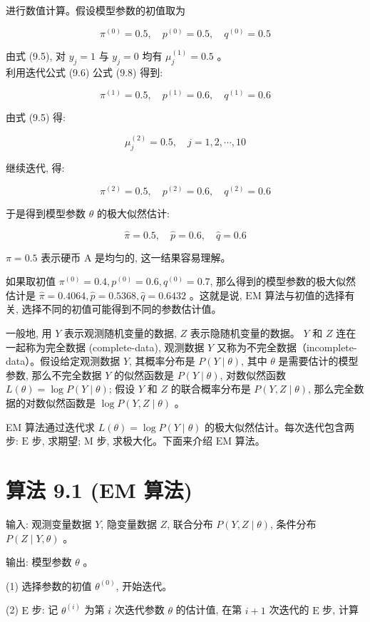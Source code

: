 \documentclass[10pt]{article}
\begin{document}
进行数值计算。假设模型参数的初值取为

$$
\pi^{(0)}=0.5, \quad p^{(0)}=0.5, \quad q^{(0)}=0.5
$$

由式 (9.5), 对 $y_{j}=1$ 与 $y_{j}=0$ 均有 $\mu_{j}^{(1)}=0.5$ 。\\
利用迭代公式 (9.6) 公式 (9.8) 得到:

$$
\pi^{(1)}=0.5, \quad p^{(1)}=0.6, \quad q^{(1)}=0.6
$$

由式 (9.5) 得:

$$
\mu_{j}^{(2)}=0.5, \quad j=1,2, \cdots, 10
$$

继续迭代, 得:

$$
\pi^{(2)}=0.5, \quad p^{(2)}=0.6, \quad q^{(2)}=0.6
$$

于是得到模型参数 $\theta$ 的极大似然估计:

$$
\hat{\pi}=0.5, \quad \hat{p}=0.6, \quad \hat{q}=0.6
$$

$\pi=0.5$ 表示硬币 $\mathrm{A}$ 是均匀的, 这一结果容易理解。

如果取初值 $\pi^{(0)}=0.4, p^{(0)}=0.6, q^{(0)}=0.7$, 那么得到的模型参数的极大似然估计是 $\hat{\pi}=0.4064, \hat{p}=0.5368, \hat{q}=0.6432$ 。这就是说, $\mathrm{EM}$ 算法与初值的选择有关, 选择不同的初值可能得到不同的参数估计值。

一般地, 用 $Y$ 表示观测随机变量的数据, $Z$ 表示隐随机变量的数据。 $Y$ 和 $Z$ 连在一起称为完全数据 (complete-data), 观测数据 $Y$ 又称为不完全数据（incomplete-data）。假设给定观测数据 $Y$, 其概率分布是 $P(Y \mid \theta)$, 其中 $\theta$ 是需要估计的模型参数, 那么不完全数据 $Y$ 的似然函数是 $P(Y \mid \theta)$, 对数似然函数 $L(\theta)=\log P(Y \mid \theta)$; 假设 $Y$ 和 $Z$ 的联合概率分布是 $P(Y, Z \mid \theta)$, 那么完全数据的对数似然函数是 $\log P(Y, Z \mid \theta)$ 。

EM 算法通过迭代求 $L(\theta)=\log P(Y \mid \theta)$ 的极大似然估计。每次迭代包含两步: $\mathrm{E}$ 步, 求期望; $\mathrm{M}$ 步, 求极大化。下面来介绍 $\mathrm{EM}$ 算法。

\section*{算法 9.1 (EM 算法)}
输入: 观测变量数据 $Y$, 隐变量数据 $Z$, 联合分布 $P(Y, Z \mid \theta)$, 条件分布 $P(Z \mid Y, \theta)$ 。

输出: 模型参数 $\theta$ 。

(1) 选择参数的初值 $\theta^{(0)}$, 开始迭代。

(2) $\mathrm{E}$ 步: 记 $\theta^{(i)}$ 为第 $i$ 次迭代参数 $\theta$ 的估计值, 在第 $i+1$ 次迭代的 $\mathrm{E}$ 步, 计算
\end{document}
